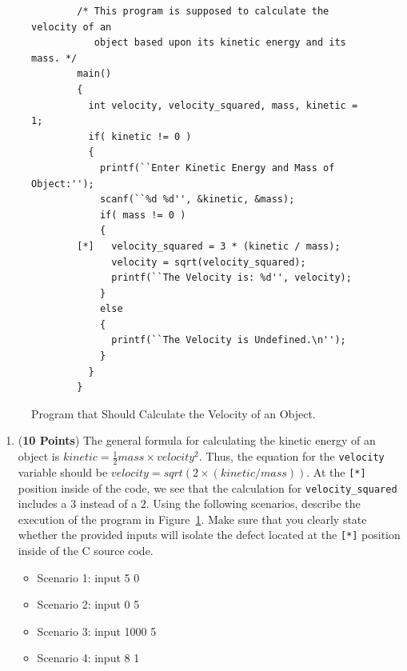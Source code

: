 \documentclass[12pt,epsf,psfig,graphics]{article}
\begin{document}
\begin{enumerate}
\begin{figure}[h]
\footnotesize{
\begin{verbatim}
        /* This program is supposed to calculate the velocity of an
           object based upon its kinetic energy and its mass. */
        main() 
        {
          int velocity, velocity_squared, mass, kinetic = 1;
          if( kinetic != 0 ) 
          {
            printf(``Enter Kinetic Energy and Mass of Object:'');
            scanf(``%d %d'', &kinetic, &mass);
            if( mass != 0 ) 
            {
        [*]   velocity_squared = 3 * (kinetic / mass);
              velocity = sqrt(velocity_squared);
              printf(``The Velocity is: %d'', velocity); 
            }
            else 
            {
              printf(``The Velocity is Undefined.\n'');
            }
          }
        }
\end{verbatim} }

\vspace*{-.2in}

\caption{Program that Should Calculate the Velocity of an Object.}
\label{pie_code}
\end{figure}

\begin{enumerate}

\item \label{need_code} ({\bf 10 Points}) The general formula for
  calculating the kinetic energy of an object is \(
  kinetic=\frac{1}{2}mass\times velocity^2 \).  Thus, the equation for
  the {\tt velocity} variable should be \( velocity=sqrt(2 \times
  (kinetic / mass)) \).  At the {\tt [*]} position inside of the code,
  we see that the calculation for {\tt velocity\_squared} includes a
  $3$ instead of a $2$.  Using the following scenarios, describe the
  execution of the program in Figure~\ref{pie_code}.  Make sure that
  you clearly state whether the provided inputs will isolate the
  defect located at the {\tt [*]} position inside of the C source
  code.


\begin{itemize}

\item Scenario 1: input 5 0
\item Scenario 2: input 0 5
\item Scenario 3: input 1000 5
\item Scenario 4: input 8 1

\end{itemize}

\end{enumerate}


\end{enumerate}
\end{document}
